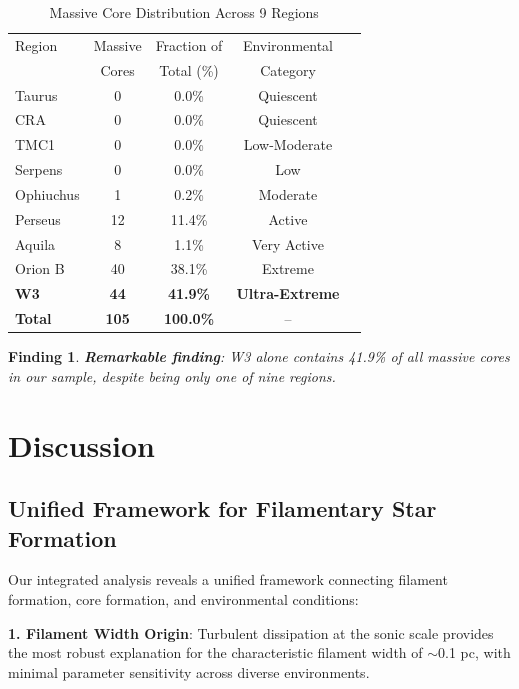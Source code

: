 \documentclass[11pt,a4paper]{article}
\newtheorem{finding}{Finding}
\begin{document}
\begin{table}[H]
\centering
\caption{Massive Core Distribution Across 9 Regions}
\begin{tabular}{lcccc}
\toprule
Region & Massive & Fraction of & Environmental \\
      & Cores & Total (\%) & Category \\
\midrule
Taurus   & 0     & 0.0\%   & Quiescent \\
CRA      & 0     & 0.0\%   & Quiescent \\
TMC1     & 0     & 0.0\%   & Low-Moderate \\
Serpens  & 0     & 0.0\%   & Low \\
Ophiuchus& 1     & 0.2\%   & Moderate \\
Perseus  & 12    & 11.4\%  & Active \\
Aquila   & 8     & 1.1\%   & Very Active \\
Orion B  & 40     & 38.1\%   & Extreme \\
\textbf{W3}     & \textbf{44}     & \textbf{41.9\%}   & \textbf{Ultra-Extreme} \\
\midrule
\textbf{Total} & \textbf{105}  & \textbf{100.0\%}  & -- \\
\bottomrule
\end{tabular}
\end{table}

\begin{finding}
\textbf{Remarkable finding}: W3 alone contains 41.9\% of all massive cores in our sample, despite being only one of nine regions.
\end{finding}

\section{Discussion}

\subsection{Unified Framework for Filamentary Star Formation}

Our integrated analysis reveals a unified framework connecting filament formation, core formation, and environmental conditions:

\textbf{1. Filament Width Origin}: Turbulent dissipation at the sonic scale provides the most robust explanation for the characteristic filament width of $\sim$0.1 pc, with minimal parameter sensitivity across diverse environments.
\end{document}
